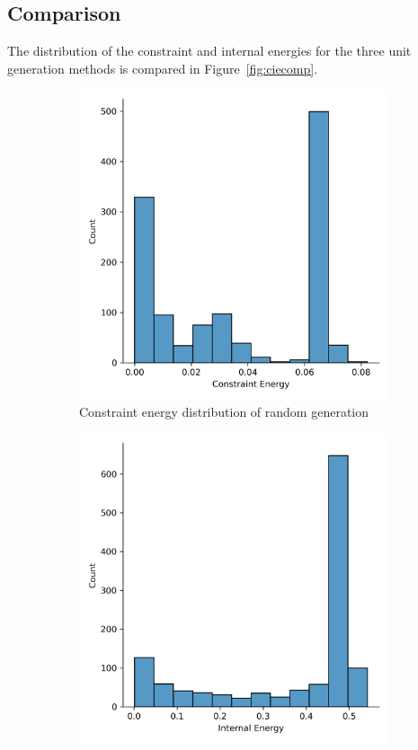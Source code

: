 \subsection{Comparison}

The distribution of the constraint and internal energies for the three unit generation methods is compared in Figure~\ref{fig:ciecomp}.

\begin{figure}[H]
	\centering
	\begin{subfigure}[c]{0.45\textwidth}
		\centering
		\includegraphics[width=\textwidth]{ce_r.png}
		\caption{Constraint energy distribution of random generation}
	\end{subfigure}
	\hfill
	\begin{subfigure}[c]{0.45\textwidth}
		\centering
		\includegraphics[width=\textwidth]{ie_r.png}

\end{subfigure}
\end{figure}
